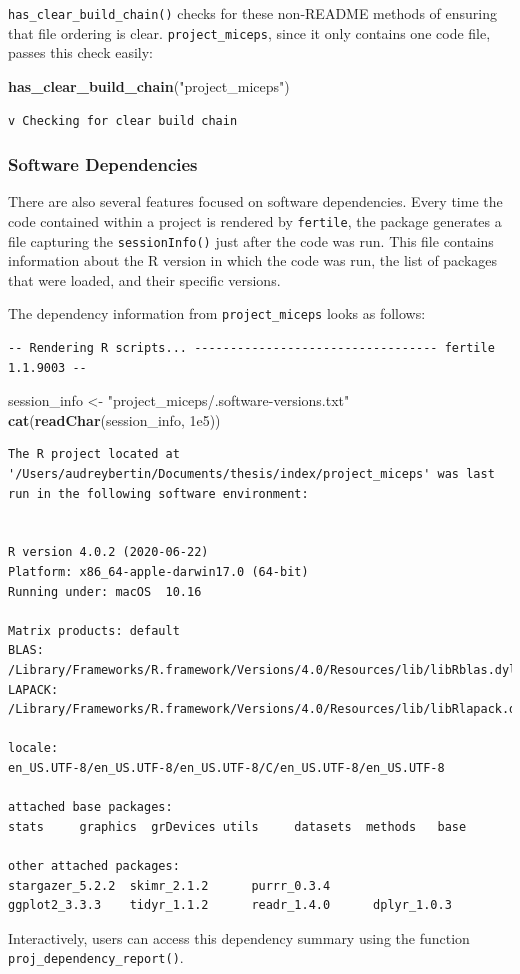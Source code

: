 \documentclass[12pt,twoside]{reedthesis}
\newenvironment{Shaded}{\begin{snugshade}}{\end{snugshade}}
\newcommand{\FloatTok}[1]{\textcolor[rgb]{0.00,0.00,0.81}{#1}}
\newcommand{\KeywordTok}[1]{\textcolor[rgb]{0.13,0.29,0.53}{\textbf{#1}}}
\newcommand{\NormalTok}[1]{#1}
\newcommand{\StringTok}[1]{\textcolor[rgb]{0.31,0.60,0.02}{#1}}
\begin{document}
\texttt{has\_clear\_build\_chain()} checks for these non-README methods of ensuring that file ordering is clear. \texttt{project\_miceps}, since it only contains one code file, passes this check easily:
\begin{Shaded}
\begin{Highlighting}[]
\KeywordTok{has_clear_build_chain}\NormalTok{(}\StringTok{"project_miceps"}\NormalTok{)}
\end{Highlighting}
\end{Shaded}
\begin{verbatim}
v Checking for clear build chain
\end{verbatim}
\hypertarget{software-dependencies}{%
\subsubsection{Software Dependencies}\label{software-dependencies}}

There are also several features focused on software dependencies. Every time the code contained within a project is rendered by \texttt{fertile}, the package generates a file capturing the \texttt{sessionInfo()} just after the code was run. This file contains information about the R version in which the code was run, the list of packages that were loaded, and their specific versions.

The dependency information from \texttt{project\_miceps} looks as follows:
\begin{verbatim}
-- Rendering R scripts... ---------------------------------- fertile 1.1.9003 --
\end{verbatim}
\begin{Shaded}
\begin{Highlighting}[]
\NormalTok{session_info <-}\StringTok{ "project_miceps/.software-versions.txt"}
\KeywordTok{cat}\NormalTok{(}\KeywordTok{readChar}\NormalTok{(session_info, }\FloatTok{1e5}\NormalTok{))}
\end{Highlighting}
\end{Shaded}
\begin{verbatim}
The R project located at '/Users/audreybertin/Documents/thesis/index/project_miceps' was last run in the following software environment:


R version 4.0.2 (2020-06-22)
Platform: x86_64-apple-darwin17.0 (64-bit)
Running under: macOS  10.16

Matrix products: default
BLAS:   /Library/Frameworks/R.framework/Versions/4.0/Resources/lib/libRblas.dylib
LAPACK: /Library/Frameworks/R.framework/Versions/4.0/Resources/lib/libRlapack.dylib

locale:
en_US.UTF-8/en_US.UTF-8/en_US.UTF-8/C/en_US.UTF-8/en_US.UTF-8

attached base packages:
stats     graphics  grDevices utils     datasets  methods   base     

other attached packages:
stargazer_5.2.2  skimr_2.1.2      purrr_0.3.4     
ggplot2_3.3.3    tidyr_1.1.2      readr_1.4.0      dplyr_1.0.3     
\end{verbatim}
Interactively, users can access this dependency summary using the function \texttt{proj\_dependency\_report()}.
\end{document}
